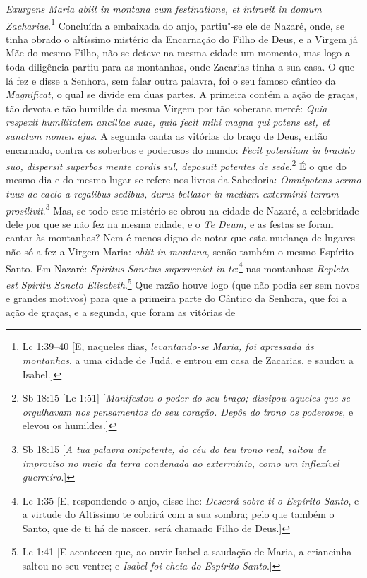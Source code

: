 \emph{Exurgens Maria abiit in montana cum festinatione, et
intravit in domum Zachariae}.\footnote{Lc 1:39--40 [E, naqueles dias, \textit{levantando-se Maria, foi apressada às montanhas}, a uma cidade de Judá, e entrou em casa de Zacarias, e saudou a Isabel.]} Concluída a embaixada do anjo,
partiu"-se ele de Nazaré, onde, se tinha obrado o altíssimo mistério da
Encarnação do Filho de Deus, e a Virgem já Mãe do mesmo Filho, não se
deteve na mesma cidade um momento, mas logo a toda diligência partiu
para as montanhas, onde Zacarias tinha a sua casa. O que lá fez e disse
a Senhora, sem falar outra palavra, foi o seu famoso cântico da
\emph{Magnificat,} o qual se divide em duas partes. A primeira contém a
ação de graças, tão devota e tão humilde da mesma Virgem por tão
soberana mercê: \emph{Quia respexit humilitatem ancillae suae, quia
fecit mihi magna qui potens est, et sanctum nomen ejus}. A
segunda canta as vitórias do braço de Deus, então encarnado, contra os
soberbos e poderosos do mundo: \emph{Fecit potentiam in brachio suo,
dispersit superbos mente cordis sul, deposuit potentes de sede}.\footnote{Sb 18:15 [Lc 1:51] [\textit{Manifestou o poder do seu braço; dissipou aqueles que se orgulhavam nos pensamentos do seu coração. Depôs do trono os poderosos}, e elevou os humildes.]} É o que do mesmo dia e do mesmo lugar se refere nos livros da
Sabedoria: \emph{Omnipotens sermo tuus de caelo a regalibus sedibus,
durus bellator in mediam exterminii terram prosilivit}.\footnote{Sb 18:15 [\textit{A tua palavra onipotente, do céu do teu trono real, saltou de improviso no meio da terra condenada ao extermínio, como um inflexível guerreiro}.]}
Mas, se todo este mistério se obrou na cidade de Nazaré, a celebridade
dele por que se não fez na mesma cidade, e o \emph{Te Deum,} e as festas
se foram cantar às montanhas? Nem é menos digno de notar que esta
mudança de lugares não só a fez a Virgem Maria: \emph{abiit in montana},
senão também o mesmo Espírito Santo. Em Nazaré: \emph{Spiritus Sanctus
superveniet in te}:\footnote{Lc 1:35 [E, respondendo o anjo, disse-lhe: \textit{Descerá sobre ti o Espírito Santo}, e a virtude do Altíssimo te cobrirá com a sua sombra; pelo que também o Santo, que de ti há de nascer, será chamado Filho de Deus.]} nas montanhas: \emph{Repleta est Spiritu
Sancto Elisabeth}.\footnote{Lc 1:41 [E aconteceu que, ao ouvir Isabel a saudação de Maria, a criancinha saltou no seu ventre; e \textit{Isabel foi cheia do Espírito Santo}.]} Que razão houve logo (que não podia ser
sem novos e grandes motivos) para que a primeira parte do Cântico da
Senhora, que foi a ação de graças, e a segunda, que foram as vitórias de
